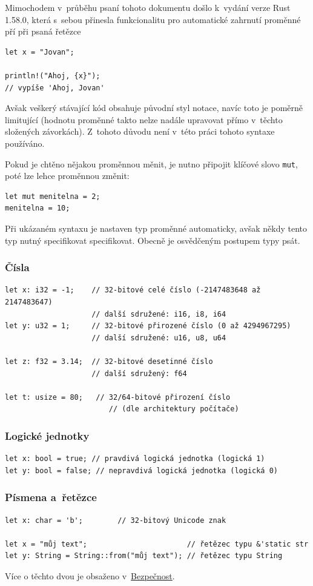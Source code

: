 \documentclass[a4paper, 12pt]{article} %
\newcommand{\rust}[1]{\texttt{#1}}
\begin{document}
		Mimochodem v~průběhu psaní tohoto dokumentu došlo k~vydání verze Rust 1.58.0, která s~sebou přinesla funkcionalitu pro automatické zahrnutí proměnné pří při psaná řetězce
		\begin{verbatim}
let x = "Jovan";

println!("Ahoj, {x}");
// vypíše 'Ahoj, Jovan'
		\end{verbatim}
		\cite{rustblog_ann}
		
		Avšak veškerý stávající kód obsahuje původní styl notace, navíc toto je poměrně limitující (hodnotu proměnné takto nelze nadále upravovat přímo v~těchto složených závorkách). Z~tohoto důvodu není v~této práci tohoto syntaxe používáno.
		
		Pokud je chtěno nějakou proměnnou měnit, je nutno připojit klíčové slovo \rust{mut}, poté lze lehce proměnnou změnit:
		\begin{verbatim}
let mut menitelna = 2;
menitelna = 10;
		\end{verbatim}

		Při ukázaném syntaxu je nastaven typ proměnné automaticky, avšak někdy tento typ nutný specifikovat specifikovat. Obecně je osvědčeným postupem typy psát.


		\subsubsection*{Čísla}
			\begin{verbatim}
let x: i32 = -1;    // 32-bitové celé číslo (-2147483648 až 2147483647)
					// další sdružené: i16, i8, i64
let y: u32 = 1;     // 32-bitové přirozené číslo (0 až 4294967295)
					// další sdružené: u16, u8, u64                

let z: f32 = 3.14;  // 32-bitové desetinné číslo 
					// další sdružený: f64

let t: usize = 80;   // 32/64-bitové přirození číslo
						// (dle architektury počítače)
			\end{verbatim}


		\subsubsection*{Logické jednotky}
			\begin{verbatim}
let x: bool = true; // pravdivá logická jednotka (logická 1)
let y: bool = false; // nepravdivá logická jednotka (logická 0)
			\end{verbatim}


		\subsubsection*{Písmena a~řetězce}
			\begin{verbatim}
let x: char = 'b';        // 32-bitový Unicode znak

let x = "můj text";                       // řetězec typu &'static str
let y: String = String::from("můj text"); // řetězec typu String
		\end{verbatim}
			Více o těchto dvou je obsaženo v~\hyperlink{vlast}{Bezpečnost}.
\end{document}
